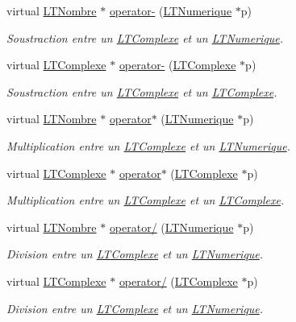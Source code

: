 \begin{DoxyCompactItemize}
virtual \hyperlink{class_l_t_nombre}{L\+T\+Nombre} $\ast$ \hyperlink{class_l_t_complexe_a201909c43638e4fc38afb660cc3995e6}{operator-\/} (\hyperlink{class_l_t_numerique}{L\+T\+Numerique} $\ast$p)
\begin{DoxyCompactList}\small\item\em Soustraction entre un \hyperlink{class_l_t_complexe}{L\+T\+Complexe} et un \hyperlink{class_l_t_numerique}{L\+T\+Numerique}. \end{DoxyCompactList}\item 
virtual \hyperlink{class_l_t_complexe}{L\+T\+Complexe} $\ast$ \hyperlink{class_l_t_complexe_a15a576fb2400217cf9c0c067c96872f5}{operator-\/} (\hyperlink{class_l_t_complexe}{L\+T\+Complexe} $\ast$p)
\begin{DoxyCompactList}\small\item\em Soustraction entre un \hyperlink{class_l_t_complexe}{L\+T\+Complexe} et un \hyperlink{class_l_t_complexe}{L\+T\+Complexe}. \end{DoxyCompactList}\item 
virtual \hyperlink{class_l_t_nombre}{L\+T\+Nombre} $\ast$ \hyperlink{class_l_t_complexe_a7a03e335c2340d08251b507ef6912a1f}{operator$\ast$} (\hyperlink{class_l_t_numerique}{L\+T\+Numerique} $\ast$p)
\begin{DoxyCompactList}\small\item\em Multiplication entre un \hyperlink{class_l_t_complexe}{L\+T\+Complexe} et un \hyperlink{class_l_t_numerique}{L\+T\+Numerique}. \end{DoxyCompactList}\item 
virtual \hyperlink{class_l_t_complexe}{L\+T\+Complexe} $\ast$ \hyperlink{class_l_t_complexe_a463b0fb6637275a816cfc2ba982e55b6}{operator$\ast$} (\hyperlink{class_l_t_complexe}{L\+T\+Complexe} $\ast$p)
\begin{DoxyCompactList}\small\item\em Multiplication entre un \hyperlink{class_l_t_complexe}{L\+T\+Complexe} et un \hyperlink{class_l_t_complexe}{L\+T\+Complexe}. \end{DoxyCompactList}\item 
virtual \hyperlink{class_l_t_nombre}{L\+T\+Nombre} $\ast$ \hyperlink{class_l_t_complexe_a317bbc9f25b431974a62a7e0950df0f3}{operator/} (\hyperlink{class_l_t_numerique}{L\+T\+Numerique} $\ast$p)
\begin{DoxyCompactList}\small\item\em Division entre un \hyperlink{class_l_t_complexe}{L\+T\+Complexe} et un \hyperlink{class_l_t_numerique}{L\+T\+Numerique}. \end{DoxyCompactList}\item 
virtual \hyperlink{class_l_t_complexe}{L\+T\+Complexe} $\ast$ \hyperlink{class_l_t_complexe_a5b9ab73f38810ee48d4670ae38f48813}{operator/} (\hyperlink{class_l_t_complexe}{L\+T\+Complexe} $\ast$p)
\begin{DoxyCompactList}\small\item\em Division entre un \hyperlink{class_l_t_complexe}{L\+T\+Complexe} et un \hyperlink{class_l_t_numerique}{L\+T\+Numerique}. \end{DoxyCompactList}\end{DoxyCompactItemize}
